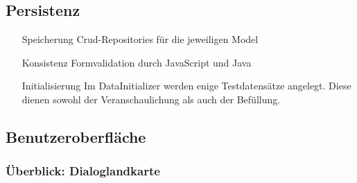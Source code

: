 \documentclass[a4paper]{article}
\begin{document}
\subsection{Persistenz}

\begin{itemize}
	\item[Speicherung] Crud-Repositories für die jeweiligen Model
	\item[Konsistenz] Formvalidation durch JavaScript und Java
	\item[Initialisierung] Im DataInitializer werden enige Testdatensätze angelegt. Diese dienen sowohl der Veranschaulichung als auch der Befüllung.
\end{itemize}

\subsection{Benutzeroberfläche}

\subsubsection{Überblick: Dialoglandkarte}
\end{document}
